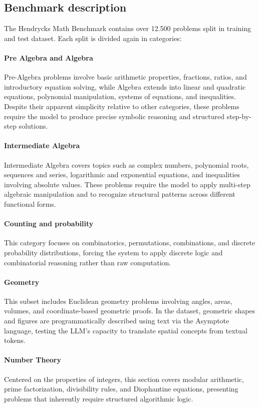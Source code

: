 \documentclass[12pt,a4paper,openright,twoside]{book}
\begin{document}
\subsection{Benchmark description}
The Hendrycks Math Benchmark contains over 12.500 problems split in training and test dataset.
Each split is divided again in categories:
\paragraph{Pre Algebra and Algebra}{Pre-Algebra problems involve basic arithmetic properties, fractions, ratios, and introductory equation solving, while Algebra extends into linear and quadratic equations, polynomial manipulation, systems of equations, and inequalities. Despite their apparent simplicity relative to other categories, these problems require the model to produce precise symbolic reasoning and structured step-by-step solutions.}
\paragraph{Intermediate Algebra}{Intermediate Algebra covers topics such as complex numbers, polynomial roots, sequences and series, logarithmic and exponential equations, and inequalities involving absolute values. These problems require the model to apply multi-step algebraic manipulation and to recognize structural patterns across different functional forms.}
\paragraph{Counting and probability}{This category focuses on combinatorics, permutations, combinations, and discrete probability distributions, forcing the system to apply discrete logic and combinatorial reasoning rather than raw computation.}
\paragraph{Geometry}{This subset includes Euclidean geometry problems involving angles, areas, volumes, and coordinate-based geometric proofs. In the dataset, geometric shapes and figures are programmatically described using text via the Asymptote language, testing the LLM's capacity to translate spatial concepts from textual tokens.}
\paragraph{Number Theory}{Centered on the properties of integers, this section covers modular arithmetic, prime factorization, divisibility rules, and Diophantine equations, presenting problems that inherently require structured algorithmic logic.}
\end{document}
